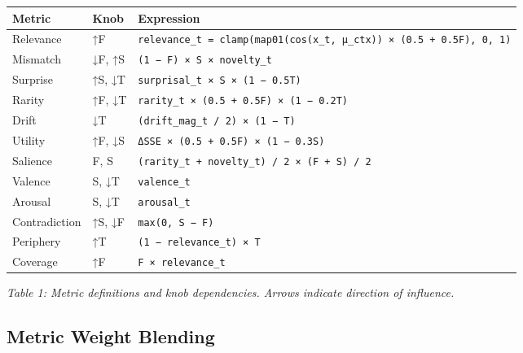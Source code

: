 \documentclass[
  letterpaper,
  DIV=11,
  numbers=noendperiod]{scrartcl}
\begin{document}
\begin{longtable}[]{@{}
  >{\raggedright\arraybackslash}p{}
  >{\raggedright\arraybackslash}p{}
  >{\raggedright\arraybackslash}p{}@{}}
\toprule\noalign{}
\begin{minipage}[b]{\linewidth}\raggedright
Metric
\end{minipage} & \begin{minipage}[b]{\linewidth}\raggedright
Knob
\end{minipage} & \begin{minipage}[b]{\linewidth}\raggedright
Expression
\end{minipage} \\
\midrule\noalign{}
\endhead
\bottomrule\noalign{}
\endlastfoot
Relevance & ↑F &
\texttt{relevance\_t\ =\ clamp(map01(cos(x\_t,\ μ\_ctx))\ ×\ (0.5\ +\ 0.5F),\ 0,\ 1)} \\
Mismatch & ↓F, ↑S & \texttt{(1\ −\ F)\ ×\ S\ ×\ novelty\_t} \\
Surprise & ↑S, ↓T & \texttt{surprisal\_t\ ×\ S\ ×\ (1\ −\ 0.5T)} \\
Rarity & ↑F, ↓T &
\texttt{rarity\_t\ ×\ (0.5\ +\ 0.5F)\ ×\ (1\ −\ 0.2T)} \\
Drift & ↓T & \texttt{(drift\_mag\_t\ /\ 2)\ ×\ (1\ −\ T)} \\
Utility & ↑F, ↓S & \texttt{ΔSSE\ ×\ (0.5\ +\ 0.5F)\ ×\ (1\ −\ 0.3S)} \\
Salience & F, S &
\texttt{(rarity\_t\ +\ novelty\_t)\ /\ 2\ ×\ (F\ +\ S)\ /\ 2} \\
Valence & S, ↓T & \texttt{valence\_t} \\
Arousal & S, ↓T & \texttt{arousal\_t} \\
Contradiction & ↑S, ↓F & \texttt{max(0,\ S\ −\ F)} \\
Periphery & ↑T & \texttt{(1\ −\ relevance\_t)\ ×\ T} \\
Coverage & ↑F & \texttt{F\ ×\ relevance\_t} \\
\end{longtable}

\emph{Table 1: Metric definitions and knob dependencies. Arrows indicate
direction of influence.}

\subsection{Metric Weight Blending}\label{metric-weight-blending}
\end{document}
